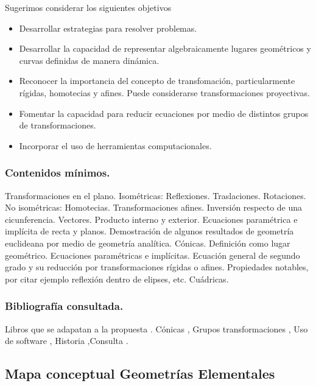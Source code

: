 \documentclass[a4paper,10pt,BCOR10mm,oneside,headsepline]{scrbook}
\begin{document}
Sugerimos considerar los siguientes objetivos
\begin{itemize}
  \item Desarrollar estrategias para resolver problemas.
  \item Desarrollar la capacidad de representar algebraicamente lugares geométricos y curvas definidas de manera dinámica.
  \item Reconocer la importancia del concepto de transfomación, particularmente rígidas, homotecias y afines. Puede  considerarse transformaciones proyectivas. 
  \item Fomentar la capacidad para reducir ecuaciones por medio de distintos grupos de transformaciones.
  \item Incorporar el uso de herramientas computacionales. 
\end{itemize}

\subsubsection{Contenidos mínimos.}  Transformaciones en el plano. Isométricas: Reflexiones. Traslaciones. Rotaciones.  No isométricas: Homotecias. Transformaciones afines.  Inversión respecto de una cicunferencia. Vectores. Producto interno y exterior.   Ecuaciones paramétrica e implícita de  recta y planos. Demostración de algunos resultados de geometría euclideana por medio de geometría analítica. Cónicas. Definición como lugar geométrico. Ecuaciones paramétricas e implícitas. Ecuación general de segundo grado y su reducción por transformaciones rígidas o afines. Propiedades notables, por citar ejemplo reflexión dentro de elipses, etc. Cuádricas. 

\subsubsection{Bibliografía consultada.} Libros que se adapatan a la propuesta \cite{C.G.Gibson97,RogerFenn248,DavidABrannan247,GeorgeA.Jennings273,DanPedoe81}. Cónicas \cite{ArsenyV.Akopyan95,VagnLundsgaardHansen85}, Grupos transformaciones \cite{H.S.M.Coxeter226, IlkaAgricola77,JudithCederberg101}, Uso de software \cite{DonaldL.Vossler72}, Historia \cite{JulianLowellCoolidge74},Consulta \cite{H.S.M.Coxeter226, IlkaAgricola77,MicheleAudin38,V.V.Prasolov88}. 
 
 
\subsection{Mapa conceptual Geometrías Elementales}
\end{document}
